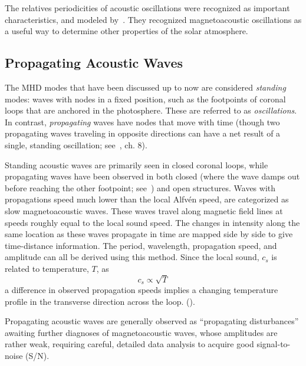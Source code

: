 \documentclass[preprint2]{aastex}
\begin{document}
The relatives periodicities of acoustic oscillations were recognized
as important characteristics, and modeled by~\cite{acoustic_1}.
They recognized magnetoacoustic oscillations as a useful way to determine
other properties of the solar atmosphere.
\subsection{Propagating Acoustic Waves}

The MHD modes that have been discussed up to now are considered
\emph{standing} modes: waves with nodes in a fixed
position, such as the footpoints of coronal loops that are anchored in
the photosphere. These are referred to as \emph{oscillations}.
In contrast, \emph{propagating} waves have nodes that move with time
(though two propagating waves traveling in opposite directions can
have a net result of a single, standing oscillation; see~\cite{Asc},
ch. 8).

Standing acoustic waves are primarily seen in closed coronal
loops, while propagating waves have been observed in both closed
(where the wave damps out before reaching the other footpoint;
see~\cite{acoustic_1})
and open structures.
Waves with propagations speed much lower than the
local Alfv\'en speed, are categorized as slow magnetoacoustic waves.
These waves travel along magnetic field lines at speeds roughly equal to
the local sound speed.
The changes in intensity along the same location as these waves
propagate in time are mapped side by side to give time-distance
information. The period, wavelength, propagation speed, and amplitude
can all be derived using this method.
Since the local sound, $c_{s}$ is related to temperature, $T$, as
\begin{equation}\label{sound-temp}
 c_{s} \propto \sqrt{T}
\end{equation}
a difference in observed propagation speeds implies a changing
temperature profile in the transverse direction across the loop.
(\cite{Nak}).

Propagating acoustic waves are generally observed as ``propagating
disturbances'' awaiting further diagnoses of magnetoacoustic waves,
whose amplitudes are rather weak, requiring careful, detailed data
analysis to acquire good signal-to-noise (S/N).
\end{document}
